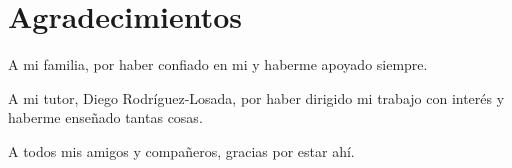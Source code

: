 
\chapter{Agradecimientos}

A mi familia, por haber confiado en mi y haberme apoyado siempre.

A mi tutor, Diego Rodríguez-Losada, por haber dirigido mi trabajo con interés y haberme enseñado tantas cosas.

A todos mis amigos y compañeros, gracias por estar ahí.